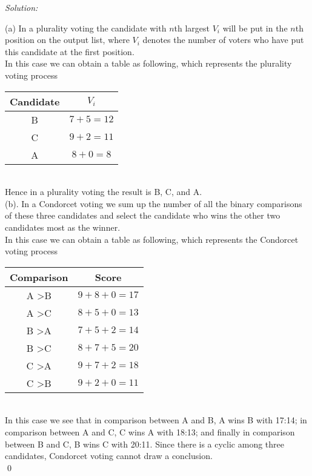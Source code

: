 \documentclass[12pt]{article}
\newenvironment{sol}
    {\emph{Solution:}
    }
    {
    \qed
    }
\begin{document}
\begin{sol}
	(a) In a plurality voting the candidate with $n$th largest $V_i$ will be put in the $ n $th position on the output list, where $V_i$ denotes the number of voters who have put this candidate at the first position.\\
	In this case we can obtain a table as following, which represents the plurality voting process
	\begin{table}[h]
		\centering
		\begin{tabular}{|c|c|}
			\hline
			Candidate & $V_i$ \\ \hline
			B & $7+5 = 12$ \\ \hline
			C & $9+2 = 11$ \\ \hline
			A & $8+0 = 8$  \\ \hline
		\end{tabular}
	\end{table} \\
	Hence in a plurality voting the result is B, C, and A. \\
	(b). In a Condorcet voting we sum up the number of all the binary comparisons of these three candidates and select the candidate who wins the other two candidates most as the winner. \\
	In this case we can obtain a table as following, which represents the Condorcet voting process
	\begin{table}[h]
		\centering
		\begin{tabular}{|c|c|}
			\hline
			Comparison & Score \\ \hline
			A \textgreater B & $ 9 + 8 + 0 = 17 $ \\ \hline
			A \textgreater C & $8 + 5 + 0 = 13$ \\ \hline
			B \textgreater A & $7 + 5 +2 = 14$ \\ \hline
			B \textgreater C & $8 + 7 + 5 = 20$ \\ \hline
			C \textgreater A & $9 + 7 + 2 = 18$ \\ \hline
			C \textgreater B & $9 + 2 + 0 = 11$ \\ \hline
		\end{tabular}
	\end{table}\\
	In this case we see that in comparison between A and B, A wins B with 17:14; in comparison between A and C, C wins A with 18:13; and finally in comparison between B and C, B wins C with 20:11. Since there is a cyclic among three candidates, Condorcet voting cannot draw a conclusion.\\

\end{sol}
\end{document}

